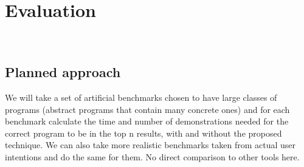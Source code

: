 \section{Evaluation}~\label{sec:eval}
\subsection{Planned approach}

We will take a set of artificial benchmarks chosen to have large classes of programs (abstract programs that contain many concrete ones) and for each benchmark calculate the time and number of demonstrations needed for the correct program to be in the top n results, with and without the proposed technique. We can also take more realistic benchmarks taken from actual user intentions and do the same for them. No direct comparison to other tools here.